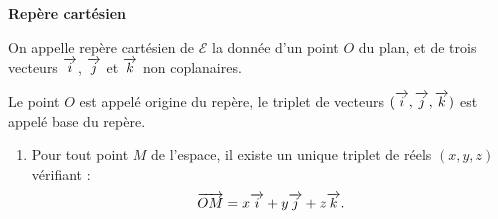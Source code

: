 \documentclass[10pt,oneside]{article}
\begin{document}
\begin{defi}
\textbf{Repère cartésien}

On appelle repère cartésien de $\mathcal{E}$ la donnée d'un point $O$ du plan, et de trois vecteurs $\overrightarrow{i}$, $\overrightarrow{j}$ et $\overrightarrow{k}$ non coplanaires.

Le point $O$ est appelé origine du repère, le triplet de vecteurs $(\overrightarrow{i}, \overrightarrow{j}, \overrightarrow{k})$ est appelé base du repère.
\end{defi}

\begin{rem}

\begin{enumerate}
\item Pour tout point $M$ de l'espace, il existe un unique triplet de réels $(x,y,z)$ vérifiant :
$$\overrightarrow{OM}=x\overrightarrow{i}+y\overrightarrow{j}+z\overrightarrow{k}.$$


\end{enumerate}
\end{rem}
\end{document}
